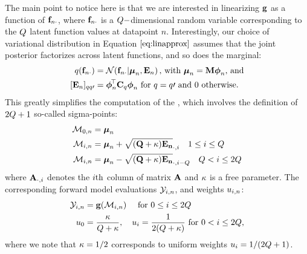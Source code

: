 The main point to notice here is that we are interested in linearizing $\mathbf{g}$ as a function of $\mathbf{f}_{n \cdot}$,
 where $\mathbf{f}_{n \cdot}$ is a $Q-$dimensional random variable corresponding to the 
 $Q$ latent function values at datapoint $n$. Interestingly, our choice of variational 
 distribution in Equation $\eqref{eq:linapprox}$ assumes that the joint posterior factorizes 
 across latent functions, and so does the marginal:
 \begin{align}
	q( \mathbf{f}_{n \cdot} ) &= \mathcal{N}\!\left({\mathbf{f}_{n \cdot}}\middle\vert{ \boldsymbol{ \mu } _n, \mathbf{E}_n}\right) \text{, with  } \boldsymbol{ \mu }_n= \mathbf{M} \boldsymbol\phi_n  \text{, and}\\
	\label{eq:covqf}
	[\mathbf{E}_n]_{qq\prime}  &=  \boldsymbol\phi_n^{\!\top}  \mathbf{C}_q \boldsymbol\phi_n  \text{ for } q = q\prime \text{  and } 0 \text{ otherwise}  \text{.}
 \end{align}
 This greatly simplifies 
the computation of the \ut, which involves the definition of $2Q+1$ so-called sigma-points:
 \begin{align}
\mathcal{M}_{0,n} & = \boldsymbol{ \mu }_n \\
\mathcal{M}_{i,n} & =  \boldsymbol{ \mu }_n +  \mathbf{\sqrt{ (Q + \kappa) \mathbf{E}_n}}_{\cdot,i} \quad 1 \leq i \leq Q \\
\mathcal{M}_{i,n} & = \boldsymbol{ \mu }_n  -  \mathbf{\sqrt{ (Q + \kappa) \mathbf{E}_n}}_{\cdot,i-Q} \quad Q < i \leq   2Q
 \end{align}
where $\mathbf{\mathbf{A}}_{\cdot,i}$ denotes the $i\mathrm{th}$ column of matrix $\mathbf{A}$ and 
$\kappa$ is a free parameter.
The corresponding forward model evaluations $\mathcal{Y}_{i,n}$, and weights $u_{i,n}$:
\begin{align}
 	\mathcal{Y}_{i,n} & = \mathbf{g}(\mathcal{M}_{i,n})   \quad \text{ for } 0 \leq i \leq 2Q\\\
	u_{0} &= \frac{ \kappa}{Q +  \kappa}, \quad
	u_{i} = \frac{1}{2(Q +  \kappa)}  \text{ for }     0  < i  \leq 2Q  \text{,}
\end{align}
 where we note that $\kappa=1/2$ corresponds to uniform weights $u_{i} = 1/(2Q+1)$.
 
